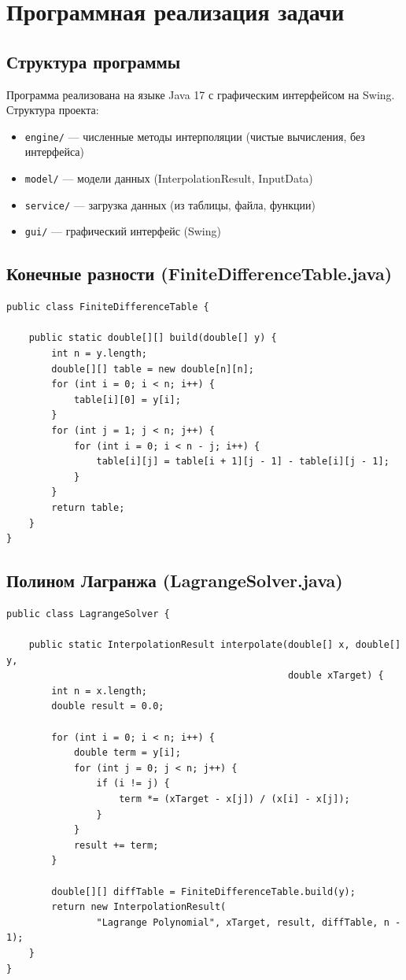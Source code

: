 \section{Программная реализация задачи}

\subsection{Структура программы}

Программа реализована на языке Java 17 с графическим интерфейсом на Swing. Структура проекта:

\begin{itemize}
\item \texttt{engine/} — численные методы интерполяции (чистые вычисления, без интерфейса)
\item \texttt{model/} — модели данных (InterpolationResult, InputData)
\item \texttt{service/} — загрузка данных (из таблицы, файла, функции)
\item \texttt{gui/} — графический интерфейс (Swing)
\end{itemize}

\subsection{Конечные разности (FiniteDifferenceTable.java)}

\begin{lstlisting}[style=javaStyle, label=code:fd]
public class FiniteDifferenceTable {

    public static double[][] build(double[] y) {
        int n = y.length;
        double[][] table = new double[n][n];
        for (int i = 0; i < n; i++) {
            table[i][0] = y[i];
        }
        for (int j = 1; j < n; j++) {
            for (int i = 0; i < n - j; i++) {
                table[i][j] = table[i + 1][j - 1] - table[i][j - 1];
            }
        }
        return table;
    }
}
\end{lstlisting}

\subsection{Полином Лагранжа (LagrangeSolver.java)}

\begin{lstlisting}[style=javaStyle, label=code:lagrange]
public class LagrangeSolver {

    public static InterpolationResult interpolate(double[] x, double[] y,
                                                  double xTarget) {
        int n = x.length;
        double result = 0.0;

        for (int i = 0; i < n; i++) {
            double term = y[i];
            for (int j = 0; j < n; j++) {
                if (i != j) {
                    term *= (xTarget - x[j]) / (x[i] - x[j]);
                }
            }
            result += term;
        }

        double[][] diffTable = FiniteDifferenceTable.build(y);
        return new InterpolationResult(
                "Lagrange Polynomial", xTarget, result, diffTable, n - 1);
    }
}
\end{lstlisting}

